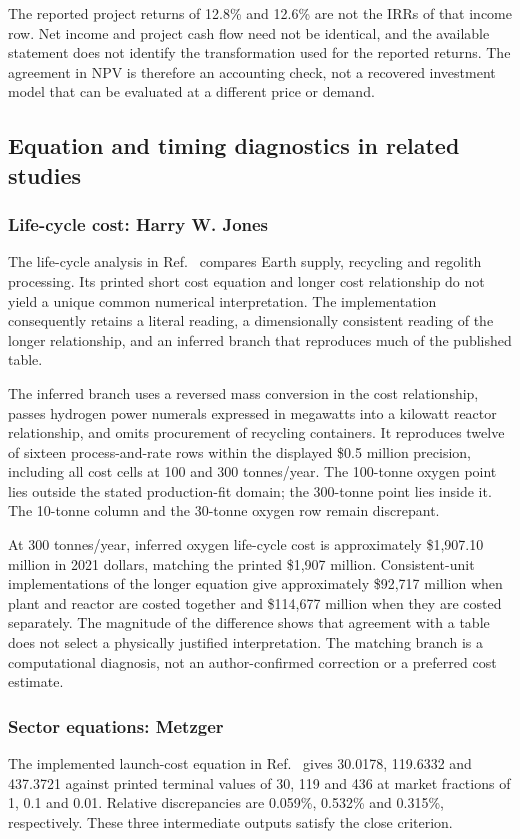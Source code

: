 \documentclass[final,5p,times,twocolumn]{elsarticle}
\begin{document}
The reported project returns of 12.8\% and 12.6\% are not the IRRs of that income row. Net income and project cash flow need not be identical, and the available statement does not identify the transformation used for the reported returns. The agreement in NPV is therefore an accounting check, not a recovered investment model that can be evaluated at a different price or demand.

\subsection{Equation and timing diagnostics in related studies}
\subsubsection{Life-cycle cost: Harry W. Jones}
The life-cycle analysis in Ref.~\cite{jones2021} compares Earth supply, recycling and regolith processing. Its printed short cost equation and longer cost relationship do not yield a unique common numerical interpretation. The implementation consequently retains a literal reading, a dimensionally consistent reading of the longer relationship, and an inferred branch that reproduces much of the published table.

The inferred branch uses a reversed mass conversion in the cost relationship, passes hydrogen power numerals expressed in megawatts into a kilowatt reactor relationship, and omits procurement of recycling containers. It reproduces twelve of sixteen process-and-rate rows within the displayed \$0.5 million precision, including all cost cells at 100 and 300 tonnes/year. The 100-tonne oxygen point lies outside the stated production-fit domain; the 300-tonne point lies inside it. The 10-tonne column and the 30-tonne oxygen row remain discrepant.

At 300 tonnes/year, inferred oxygen life-cycle cost is approximately \$1,907.10 million in 2021 dollars, matching the printed \$1,907 million. Consistent-unit implementations of the longer equation give approximately \$92,717 million when plant and reactor are costed together and \$114,677 million when they are costed separately. The magnitude of the difference shows that agreement with a table does not select a physically justified interpretation. The matching branch is a computational diagnosis, not an author-confirmed correction or a preferred cost estimate.

\subsubsection{Sector equations: Metzger}
The implemented launch-cost equation in Ref.~\cite{metzger2023} gives 30.0178, 119.6332 and 437.3721 against printed terminal values of 30, 119 and 436 at market fractions of 1, 0.1 and 0.01. Relative discrepancies are 0.059\%, 0.532\% and 0.315\%, respectively. These three intermediate outputs satisfy the close criterion.
\end{document}
